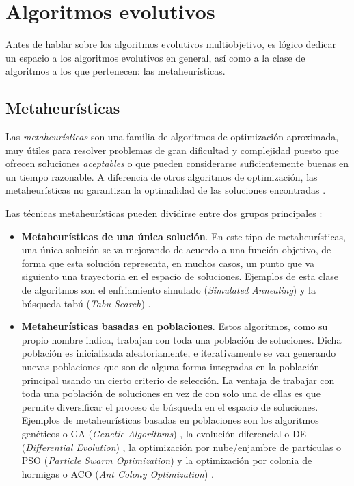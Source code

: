 \section{Algoritmos evolutivos}

Antes de hablar sobre los algoritmos evolutivos multiobjetivo, es lógico dedicar un espacio a los algoritmos evolutivos en general, así como a la clase de algoritmos a los que pertenecen: las metaheurísticas.

\subsection{Metaheurísticas}

Las \emph{metaheurísticas} son una familia de algoritmos de optimización aproximada, muy útiles para resolver problemas de gran dificultad y complejidad puesto que ofrecen soluciones \emph{aceptables} o que pueden considerarse suficientemente buenas en un tiempo razonable. A diferencia de otros algoritmos de optimización, las metaheurísticas no garantizan la optimalidad de las soluciones encontradas \cite{talbi2009metaheuristics}.

Las técnicas metaheurísticas pueden dividirse entre dos grupos principales \cite{jose2016automatic} \cite{talbi2009metaheuristics}:

\begin{itemize}
	\item \textbf{Metaheurísticas de una única solución}. En este tipo de metaheurísticas, una única solución se va mejorando de acuerdo a una función objetivo, de forma que esta solución representa, en muchos casos, un punto que va siguiento una trayectoria en el espacio de soluciones. Ejemplos de esta clase de algoritmos son el enfriamiento simulado (\emph{Simulated Annealing}) \cite{kirkpatrick1983optimization} y la búsqueda tabú (\emph{Tabu Search}) \cite{glover1990tabu}.
	\item \textbf{Metaheurísticas basadas en poblaciones}. Estos algoritmos, como su propio nombre indica, trabajan con toda una población de soluciones. Dicha población es inicializada aleatoriamente, e iterativamente se van generando nuevas poblaciones que son de alguna forma integradas en la población principal usando un cierto criterio de selección. La ventaja de trabajar con toda una población de soluciones en vez de con solo una de ellas es que permite diversificar el proceso de búsqueda en el espacio de soluciones. Ejemplos de metaheurísticas basadas en poblaciones son los algoritmos genéticos o GA (\emph{Genetic Algorithms}) \cite{holland1992adaptation}, la evolución diferencial o DE (\emph{Differential Evolution}) \cite{storn1997differential}, la optimización por nube/enjambre de partículas o PSO (\emph{Particle Swarm Optimization}) \cite{kennedy1995particle} y la optimización por colonia de hormigas o ACO (\emph{Ant Colony Optimization}) \cite{dorigo1996ant}.
\end{itemize}

